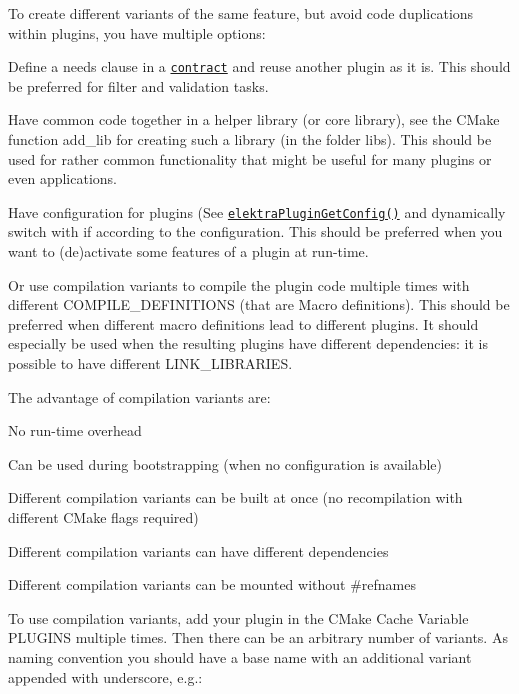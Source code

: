 To create different variants of the same feature, but avoid code duplications within plugins, you have multiple options\+:


\begin{DoxyItemize}
\item Define a needs clause in a \href{/home/jenkins/workspace/libelektra-release/doc/CONTRACT.ini}{\tt contract} and reuse another plugin as it is. This should be preferred for filter and validation tasks.
\item Have common code together in a helper library (or core library), see the C\+Make function {\ttfamily add\+\_\+lib} for creating such a library (in the folder libs). This should be used for rather common functionality that might be useful for many plugins or even applications.
\item Have configuration for plugins (See \href{https://doc.libelektra.org/api/latest/html/group__plugin.html}{\tt elektra\+Plugin\+Get\+Config()} and dynamically switch with {\ttfamily if} according to the configuration. This should be preferred when you want to (de)activate some features of a plugin at run-\/time.
\item Or use compilation variants to compile the plugin code multiple times with different {\ttfamily C\+O\+M\+P\+I\+L\+E\+\_\+\+D\+E\+F\+I\+N\+I\+T\+I\+O\+NS} (that are Macro definitions). This should be preferred when different macro definitions lead to different plugins. It should especially be used when the resulting plugins have different dependencies\+: it is possible to have different {\ttfamily L\+I\+N\+K\+\_\+\+L\+I\+B\+R\+A\+R\+I\+ES}.
\end{DoxyItemize}

The advantage of compilation variants are\+:


\begin{DoxyItemize}
\item No run-\/time overhead
\item Can be used during bootstrapping (when no configuration is available)
\item Different compilation variants can be built at once (no recompilation with different C\+Make flags required)
\item Different compilation variants can have different dependencies
\item Different compilation variants can be mounted without {\ttfamily \#refnames}
\end{DoxyItemize}

To use compilation variants, add your plugin in the C\+Make Cache Variable {\ttfamily P\+L\+U\+G\+I\+NS} multiple times. Then there can be an arbitrary number of variants. As naming convention you should have a base name with an additional variant appended with underscore, e.\+g.\+:



